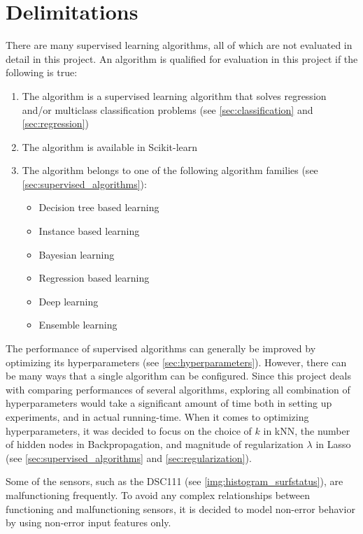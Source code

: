 \section{Delimitations} \label{sec:delimitations}
	There are many supervised learning algorithms, all of which are not evaluated in detail in this project. An algorithm is qualified for evaluation in this project if the following is true:
	\begin{enumerate}
		\item The algorithm is a supervised learning algorithm that solves regression and/or multiclass classification problems (see \ref{sec:classification} and \ref{sec:regression})
		\item The algorithm is available in Scikit-learn \cite{WEBSITE:15}
		\item The algorithm belongs to one of the following algorithm families (see \ref{sec:supervised_algorithms}):
			\begin{itemize}
				\item Decision tree based learning %
				\item Instance based learning %
				\item Bayesian learning %
				\item Regression based learning %
				\item Deep learning %
				\item Ensemble learning %
			\end{itemize}
	\end{enumerate}

	The performance of supervised algorithms can generally be improved by optimizing its hyperparameters (see \ref{sec:hyperparameters}). However, there can be many ways that a single algorithm can be configured. Since this project deals with comparing performances of several algorithms, exploring all combination of hyperparameters would take a significant amount of time both in setting up experiments, and in actual running-time. When it comes to optimizing hyperparameters, it was decided to focus on the choice of $k$ in kNN, the number of hidden nodes in Backpropagation, and magnitude of regularization $\lambda$ in Lasso (see \ref{sec:supervised_algorithms} and \ref{sec:regularization}).
 
	Some of the sensors, such as the DSC111 (see \ref{img:histogram_surfstatus}), are malfunctioning frequently. To avoid any complex relationships between functioning and malfunctioning sensors, it is decided to model non-error behavior by using non-error input features only. 

